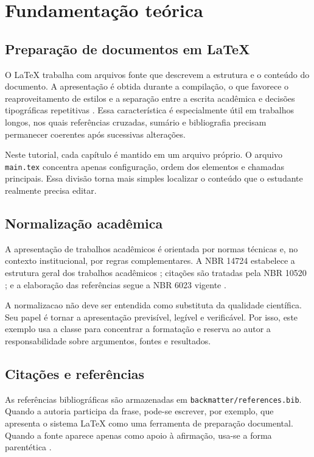 \section{Fundamentação teórica}\label{sec:background}

\subsection{Preparação de documentos em LaTeX}

O LaTeX trabalha com arquivos fonte que descrevem a estrutura e o conteúdo do documento. A apresentação é obtida durante a compilação, o que favorece o reaproveitamento de estilos e a separação entre a escrita acadêmica e decisões tipográficas repetitivas \parencite{lamport1994}. Essa característica é especialmente útil em trabalhos longos, nos quais referências cruzadas, sumário e bibliografia precisam permanecer coerentes após sucessivas alterações.

Neste tutorial, cada capítulo é mantido em um arquivo próprio. O arquivo \texttt{main.tex} concentra apenas configuração, ordem dos elementos e chamadas principais. Essa divisão torna mais simples localizar o conteúdo que o estudante realmente precisa editar.

\subsection{Normalização acadêmica}

A apresentação de trabalhos acadêmicos é orientada por normas técnicas e, no contexto institucional, por regras complementares. A NBR 14724 estabelece a estrutura geral dos trabalhos acadêmicos \parencite{abnt14724}; citações são tratadas pela NBR 10520 \parencite{abnt10520}; e a elaboração das referências segue a NBR 6023 vigente \parencite{abnt6023}.

A \gls{normalizacao} não deve ser entendida como substituta da qualidade científica. Seu papel é tornar a apresentação previsível, legível e verificável. Por isso, este exemplo usa a classe para concentrar a formatação e reserva ao autor a responsabilidade sobre argumentos, fontes e resultados.

\subsection{Citações e referências}

As referências bibliográficas são armazenadas em \texttt{backmatter/references.bib}. Quando a autoria participa da frase, pode-se escrever, por exemplo, que \textcite{lamport1994} apresenta o sistema LaTeX como uma ferramenta de preparação documental. Quando a fonte aparece apenas como apoio à afirmação, usa-se a forma parentética \parencite{abnt6023}.

